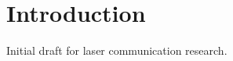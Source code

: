 \documentclass{article}
\begin{document}
 
\section{Introduction} 
Initial draft for laser communication research. 
\end{document}
